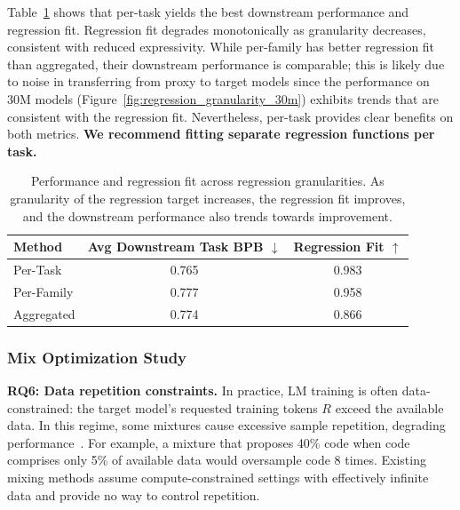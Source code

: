 \documentclass[table]{ai2style/ai2}
\begin{document}
Table~\ref{tab:granularity} shows that per-task yields the best downstream performance and regression fit.
Regression fit degrades monotonically as granularity decreases, consistent with reduced expressivity.
While per-family has better regression fit than aggregated, their downstream performance is comparable; this is likely due to noise in transferring from proxy to target models since the performance on 30M models (Figure~\ref{fig:regression_granularity_30m}) exhibits trends that are consistent with the regression fit.
Nevertheless, per-task provides clear benefits on both metrics. \textbf{We recommend fitting separate regression functions per task.}

\begin{table}[t]
\centering
\caption{Performance and regression fit across regression granularities. As granularity of the regression target increases, the regression fit improves, and the downstream performance also trends towards improvement.}
\begin{tabular}{lcc}
\toprule
Method & Avg Downstream Task BPB $\downarrow$ & Regression Fit $\uparrow$ \\
\midrule
\rowcolor{ai2lightpink} Per-Task      & 0.765 & 0.983 \\
Per-Family    & 0.777 & 0.958 \\
Aggregated    & 0.774 & 0.866 \\
\bottomrule
\end{tabular}
\label{tab:granularity}
\end{table}

\subsubsection{Mix Optimization Study}\label{sec:optimization}

\textbf{RQ6: Data repetition constraints.}
In practice, LM training is often data-constrained: the target model’s requested training tokens $R$ exceed the available data. 
In this regime, some mixtures cause excessive sample repetition, degrading performance~\citep{muennighoff2025scalingdataconstrainedlanguagemodels}.
For example, a mixture that proposes 40\% code when code comprises only 5\% of available data would oversample code 8 times. Existing mixing methods assume compute-constrained settings with effectively infinite data and provide no way to control repetition. 
\end{document}
